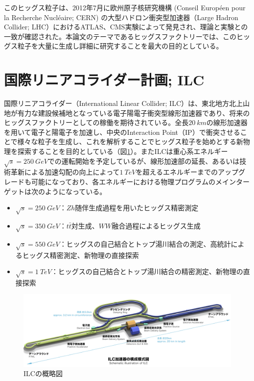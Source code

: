 このヒッグス粒子は、2012年7月に欧州原子核研究機構 (Conseil Europ\'een pour la Recherche Nucl\'eaire; CERN) の大型ハドロン衝突型加速器（Large Hadron Collider; LHC）におけるATLAS、CMS実験によって発見され、理論と実験との一致が確認された。本論文のテーマであるヒッグスファクトリーでは、このヒッグス粒子を大量に生成し詳細に研究することを最大の目的としている。\\

\section{国際リニアコライダー計画; ILC}
国際リニアコライダー（International Linear Collider; ILC）は、東北地方北上山地が有力な建設候補地となっている電子陽電子衝突型線形加速器であり、将来のヒッグスファクトリーとしての稼働を期待されている。全長$\SI{20}{km}$の線形加速器を用いて電子と陽電子を加速し、中央のInteraction Point（IP）で衝突させることで様々な粒子を生成し、これを解析することでヒッグス粒子を始めとする新物理を探索することを目的としている（図\ref{ilc}）。またILCは重心系エネルギー$\sqrt{s} = \SI{250}{GeV}$での運転開始を予定しているが、線形加速部の延長、あるいは技術革新による加速勾配の向上によって$\SI{1}{TeV}$を超えるエネルギーまでのアップグレードも可能になっており、各エネルギーにおける物理プログラムのメインターゲットは次のようになっている。
\begin{itemize}
\item $\sqrt{s} = \SI{250}{GeV}$：$Zh$随伴生成過程を用いたヒッグス精密測定
\item $\sqrt{s} = \SI{350}{GeV}$：$t\bar{t}$対生成、$WW$融合過程によるヒッグス生成
\item $\sqrt{s} = \SI{550}{GeV}$：ヒッグスの自己結合とトップ湯川結合の測定、高統計によるヒッグス精密測定、新物理の直接探索
\item $\sqrt{s} = \SI{1}{TeV}$：ヒッグスの自己結合とトップ湯川結合の精密測定、新物理の直接探索
\end{itemize}
\begin{figure}[t]
	\begin{center}
 \includegraphics[keepaspectratio, scale=0.25]
 	{Figure/Introduction/ilc.png}
 		\caption{ILCの概略図}
 		\label{ilc}
	\end{center}
\end{figure}

